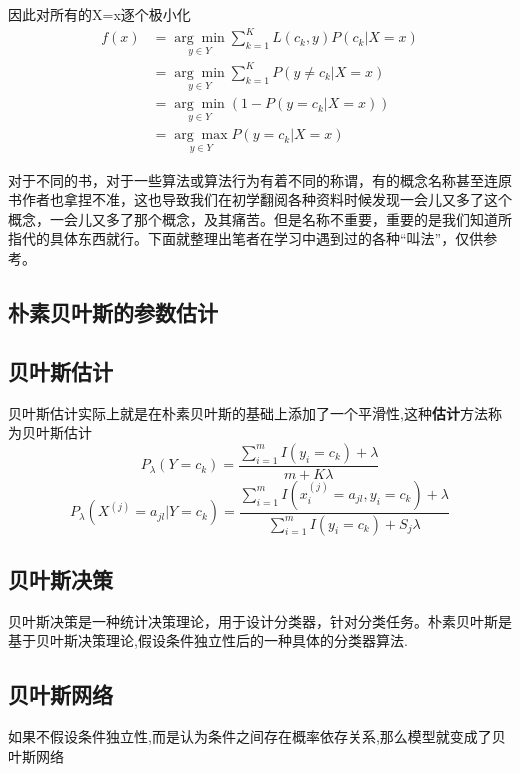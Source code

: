     因此对所有的X=x逐个极小化
    \begin{equation}
        \begin{aligned}
            f(x) &=\underset{y \in Y}{\arg \min } \sum_{k=1}^{K} L\left(c_{k}, y\right) P\left(c_{k} | X=x\right) \\ &=\underset{y \in Y}{\arg \min } \sum_{k=1}^{K} P\left(y \neq c_{k} | X=x\right) \\ &=\underset{y \in Y}{\arg \min }\left(1-P\left(y=c_{k} | X=x\right)\right) \\ &=\underset{y \in Y}{\arg \max } P\left(y=c_{k} | X=x\right) 
        \end{aligned}
    \end{equation}

    对于不同的书，对于一些算法或算法行为有着不同的称谓，有的概念名称甚至连原书作者也拿捏不准，这也导致我们在初学翻阅各种资料时候发现一会儿又多了这个概念，一会儿又多了那个概念，及其痛苦。但是名称不重要，重要的是我们知道所指代的具体东西就行。下面就整理出笔者在学习中遇到过的各种“叫法”，仅供参考。
    
    \subsection{朴素贝叶斯的参数估计}
    \subsection{贝叶斯估计}
    贝叶斯估计实际上就是在朴素贝叶斯的基础上添加了一个平滑性,这种\textbf{估计}方法称为贝叶斯估计
    \begin{equation}
        P_{\lambda}\left(Y=c_{k}\right)=\frac{\sum_{i=1}^{m} I\left(y_{i}=c_{k}\right)+\lambda}{m+K \lambda}
    \end{equation}
    \begin{equation}
        P_{\lambda}\left(X^{(j)}=a_{j l} | Y=c_{k}\right)=\frac{\sum_{i=1}^{m} I\left(x_{i}^{(j)}=a_{j l}, y_{i}=c_{k}\right)+\lambda}{\sum_{i=1}^{m} I\left(y_{i}=c_{k}\right)+S_{j} \lambda}
    \end{equation}
    \subsection{贝叶斯决策}
    贝叶斯决策是一种统计决策理论，用于设计分类器，针对分类任务。朴素贝叶斯是基于贝叶斯决策理论,假设条件独立性后的一种具体的分类器算法.

    \subsection{贝叶斯网络}
    如果不假设条件独立性,而是认为条件之间存在概率依存关系,那么模型就变成了贝叶斯网络
